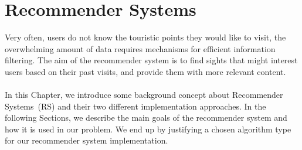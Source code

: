 \chapter{Recommender Systems}
\label{theory}
\thispagestyle{plain}

Very often, users do not know the touristic points they would like to visit, the overwhelming amount of data requires mechanisms for efficient information filtering. The aim of the recommender system is to find sights that might interest users based on their past visits, and provide them with more relevant content.\\
\\
In this Chapter, we introduce some background concept about Recommender Systems~(RS) and their two different implementation approaches. In the following Sections, we describe the main goals of the recommender system and how it is used in our problem. We end up by justifying a chosen algorithm type for our recommender system implementation.

